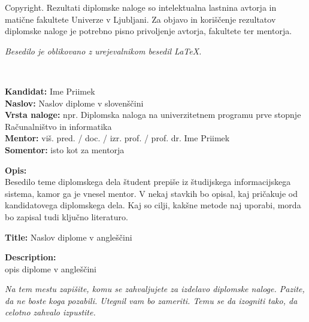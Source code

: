 \documentclass[a4paper, 12pt]{book}
\newcommand{\clearemptydoublepage}{\newpage{\pagestyle{empty}\cleardoublepage}}
\begin{document}
\thispagestyle{empty}
\vspace*{8cm}

\noindent
{\sc Copyright}. 
Rezultati diplomske naloge so intelektualna lastnina avtorja in matične fakultete Univerze v Ljubljani.
Za objavo in koriščenje rezultatov diplomske naloge je potrebno pisno privoljenje avtorja, fakultete ter mentorja.

\begin{center}
\mbox{}\vfill
\emph{Besedilo je oblikovano z urejevalnikom besedil \LaTeX.}
\end{center}
\clearemptydoublepage

\thispagestyle{empty}
\
\vfill

\bigskip
\noindent\textbf{Kandidat:} Ime Priimek\\
\noindent\textbf{Naslov:} Naslov diplome v slovenščini\\
\noindent\textbf{Vrsta naloge:} npr. Diplomska naloga na univerzitetnem programu prve stopnje Računalništvo in informatika \\
\noindent\textbf{Mentor:} viš. pred. / doc. / izr. prof. / prof. dr. Ime Priimek\\
\noindent\textbf{Somentor:} isto kot za mentorja

\bigskip
\noindent\textbf{Opis:}\\
Besedilo teme diplomskega dela študent prepiše iz študijskega informacijskega sistema, kamor ga je vnesel mentor. 
V nekaj stavkih bo opisal, kaj pričakuje od kandidatovega diplomskega dela. 
Kaj so cilji, kakšne metode naj uporabi, morda bo zapisal tudi ključno literaturo.

\bigskip
\noindent\textbf{Title:} Naslov diplome v angleščini

\bigskip
\noindent\textbf{Description:}\\
opis diplome v angleščini

\vfill



\vspace{2cm}

\clearemptydoublepage

\thispagestyle{empty}\mbox{}\vfill\null\it%
\noindent
Na tem mestu zapišite, komu se zahvaljujete za izdelavo diplomske naloge. Pazite, da ne boste koga pozabili. Utegnil vam bo zameriti. Temu se da izogniti tako, da celotno zahvalo izpustite.
\rm\normalfont
\end{document}
